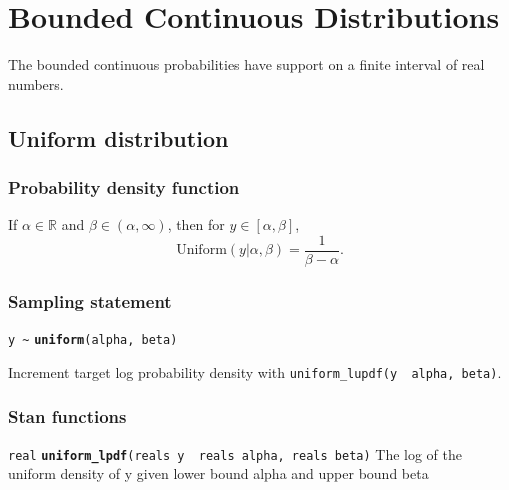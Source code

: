 \documentclass[
  10pt,
]{book}
\begin{document}
\hypertarget{bounded-continuous-distributions}{%
\chapter{Bounded Continuous Distributions}\label{bounded-continuous-distributions}}

The bounded continuous probabilities have support on a finite interval
of real numbers.

\hypertarget{uniform-distribution}{%
\section{Uniform distribution}\label{uniform-distribution}}

\hypertarget{probability-density-function-24}{%
\subsection{Probability density function}\label{probability-density-function-24}}

If \(\alpha \in \mathbb{R}\) and \(\beta \in (\alpha,\infty)\), then for
\(y \in [\alpha,\beta]\), \[ \text{Uniform}(y|\alpha,\beta) =
\frac{1}{\beta - \alpha} . \]

\hypertarget{sampling-statement-48}{%
\subsection{Sampling statement}\label{sampling-statement-48}}

\texttt{y\ \textasciitilde{}} \textbf{\texttt{uniform}}\texttt{(alpha,\ beta)}

Increment target log probability density with \texttt{uniform\_lupdf(y\ \textbar{}\ alpha,\ beta)}.

\hypertarget{stan-functions-47}{%
\subsection{Stan functions}\label{stan-functions-47}}


\texttt{real} \textbf{\texttt{uniform\_lpdf}}\texttt{(reals\ y\ \textbar{}\ reals\ alpha,\ reals\ beta)}\newline
The log of the uniform density of y given lower bound alpha and upper
bound beta
\end{document}
